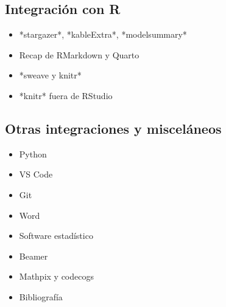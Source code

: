 \documentclass[12pt]{article}
\begin{document}
\subsection*{Integración con R}

\begin{itemize}
    \item *stargazer*, *kableExtra*, *modelsummary*
    \item Recap de RMarkdown y Quarto
    \item *sweave y knitr*
    \item *knitr* fuera de RStudio
\end{itemize}

\subsection*{Otras integraciones y misceláneos}

\begin{itemize}
    \item Python
    \item VS Code
    \item Git
    \item Word
    \item Software estadístico
    \item Beamer
    \item Mathpix y codecogs
    \item Bibliografía
\end{itemize}
\end{document}
